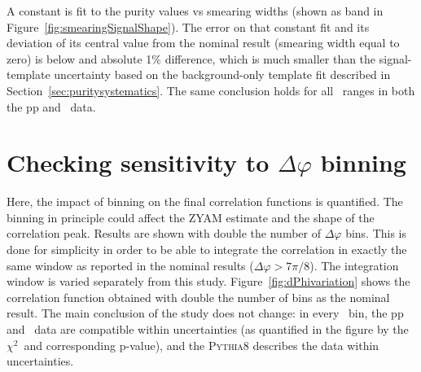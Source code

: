 A constant is fit to the purity values vs smearing widths (shown as band in Figure~\ref{fig:smearingSignalShape}). The error on that constant fit and its deviation of its central value from the nominal result (smearing width equal to zero) is below and absolute 1$\%$ difference, which is much smaller than the signal-template uncertainty based on the background-only template fit described in Section~\ref{sec:puritysystematics}. The same conclusion holds for all \pt~ranges in both the pp and \pPb~data.  


\section{Checking sensitivity to $\Delta\varphi$ binning }

Here, the impact of binning on the final correlation functions is quantified. The binning in principle could affect the ZYAM estimate and the shape of the correlation peak. Results are shown with double the number of $\Delta\varphi$ bins. This is done for simplicity in order to be able to integrate the correlation in exactly the same window as reported in the nominal results ($\Delta\varphi>7\pi/8$). The integration window is varied separately from this study. Figure~\ref{fig:dPhivariation} shows the correlation function obtained with double the number of bins as the nominal result. The main conclusion of the study does not change: in every \zt~bin, the pp and \pPb~data are compatible within uncertainties (as quantified in the figure by the $\chi^{2}$~and corresponding p-value), and the \textsc{Pythia8} describes the data within uncertainties. 

